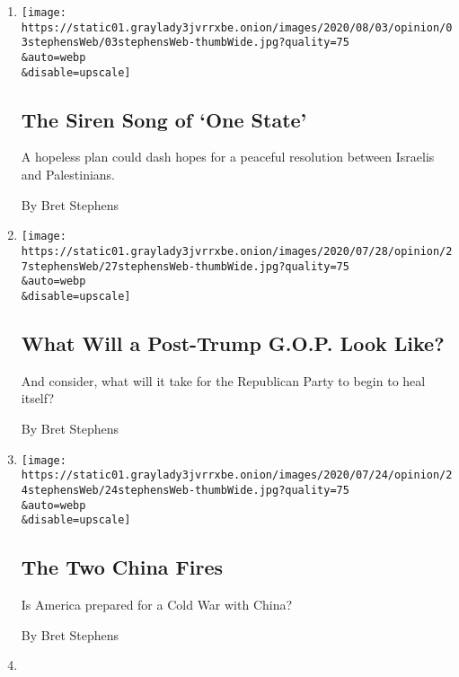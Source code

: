 \begin{enumerate}
\def\labelenumi{\arabic{enumi}.}
\item
  \href{/2020/08/03/opinion/israel-palestine-one-state-solution.html}{}

  \texttt{[image: https://static01.graylady3jvrrxbe.onion/images/2020/08/03/opinion/03stephensWeb/03stephensWeb-thumbWide.jpg?quality=75\\\&auto=webp\\\&disable=upscale]}

  \hypertarget{the-siren-song-of-one-state}{%
  \subsection{The Siren Song of `One
  State'}\label{the-siren-song-of-one-state}}

  A hopeless plan could dash hopes for a peaceful resolution between
  Israelis and Palestinians.

  By Bret Stephens
\item
  \href{/2020/07/27/opinion/trump-2020.html}{}

  \texttt{[image: https://static01.graylady3jvrrxbe.onion/images/2020/07/28/opinion/27stephensWeb/27stephensWeb-thumbWide.jpg?quality=75\\\&auto=webp\\\&disable=upscale]}

  \hypertarget{what-will-a-post-trump-gop-look-like}{%
  \subsection{What Will a Post-Trump G.O.P. Look
  Like?}\label{what-will-a-post-trump-gop-look-like}}

  And consider, what will it take for the Republican Party to begin to
  heal itself?

  By Bret Stephens
\item
  \href{/2020/07/24/opinion/china-trump.html}{}

  \texttt{[image: https://static01.graylady3jvrrxbe.onion/images/2020/07/24/opinion/24stephensWeb/24stephensWeb-thumbWide.jpg?quality=75\\\&auto=webp\\\&disable=upscale]}

  \hypertarget{the-two-china-fires}{%
  \subsection{The Two China Fires}\label{the-two-china-fires}}

  Is America prepared for a Cold War with China?

  By Bret Stephens
\item
  \href{/2020/07/17/opinion/policing-crime-baltimore.html}{}


\end{enumerate}
